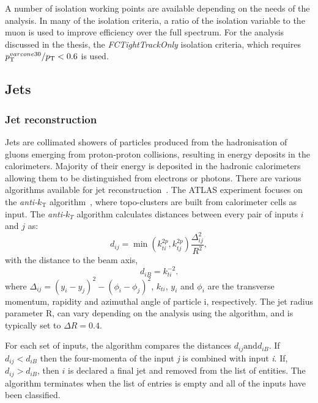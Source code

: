 A number of isolation working points are available depending on the needs of the analysis. In many of the isolation criteria, a ratio of the isolation variable to the muon \pt is used to improve efficiency over the full \pt spectrum. For the analysis discussed in the thesis, the \emph{FCTightTrackOnly} isolation criteria, which requires $p_{\text{T}}^{varcone30}/p_{\text{T}} < 0.6$ is used. 

\subsection{Jets}

\subsubsection{Jet reconstruction}
Jets are collimated showers of particles produced from the hadronisation of gluons emerging from proton-proton collisions, resulting in energy deposits in the calorimeters. Majority of their energy is deposited in the hadronic calorimeters allowing them to be distinguished from electrons or photons. There are various algorithms available for jet reconstruction~\cite{Atkin_2015}. The ATLAS experiment focuses on the \emph{anti-$k_\text{T}$} algorithm~\cite{antikt}, where topo-clusters are built from calorimeter cells as input. The \emph{anti-$k_T$} algorithm calculates distances between every pair of inputs $i$ and $j$ as:
\begin{equation}
    d_{ij} = \min\!\left(k_{ti}^{2p}, k_{tj}^{2p}\right) \frac{\Delta^2_{ij}}{R^2}, 
\end{equation}
with the distance to the beam axis,
\begin{equation}
    d_{iB} = k_{ti}^{-2}.
\end{equation}
where $\Delta_{ij} = (y_i - y_j)^2 - (\phi_i - \phi_j)^2$, $k_{ti}$, $y_i$ and $\phi_i$ are the transverse momentum, rapidity and azimuthal angle of particle i, respectively. The jet radius parameter R, can vary depending on the analysis using the algorithm, and is typically set to $\Delta R = 0.4$. 

For each set of inputs, the algorithm compares the distances $d_{ij} \mathrm{and} d_{iB}$. If $d_{ij} < d_{iB}$ then the four-momenta of the input \emph{j} is combined with input \emph{i}. If, $d_{ij} > d_{iB}$, then $i$ is declared a final jet and removed from the list of entities. The algorithm terminates when the list of entries is empty and all of the inputs have been classified. 

